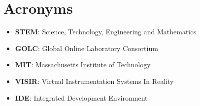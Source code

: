 \chapter*{Acronyms}

\begin{itemize}
	\item \textbf{STEM}: Science, Technology, Engineering and Mathematics

	\item \textbf{GOLC}: Global Online Laboratory Consortium

	\item \textbf{MIT}: Massachusetts Institute of Technology

	\item \textbf{VISIR}: Virtual Instrumentation Systems In Reality

	\item \textbf{IDE}: Integrated Development Environment
\end{itemize}
